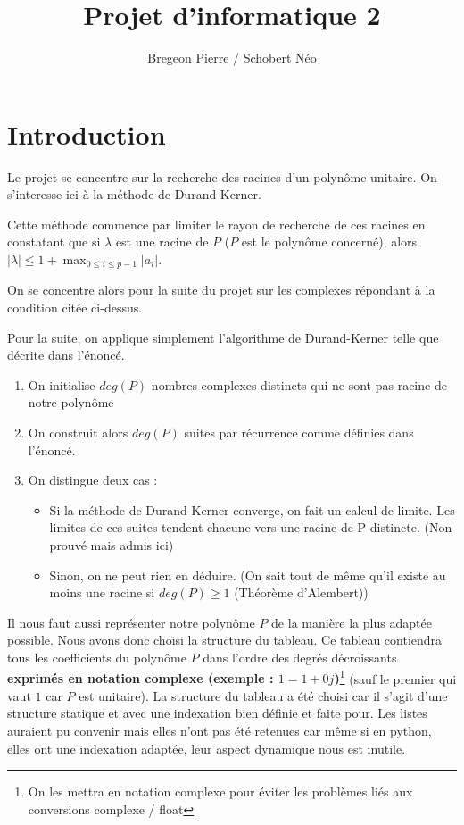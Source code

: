 \documentclass[a4paper, 11pt, hidelinks]{article}
\newcommand{\bs}{\bigskip}
\begin{document}
\title{Projet d'informatique 2}
\author{Bregeon Pierre / Schobert Néo}

\maketitle

\tableofcontents


\newpage 


\section{Introduction}
Le projet se concentre sur la recherche des racines d'un polynôme unitaire. On s'interesse ici à la méthode de Durand-Kerner.

\bs 
Cette méthode commence par limiter le rayon de recherche de ces racines en constatant que si $\lambda$ est une racine de $P$ ($P$ est le polynôme concerné),
alors $|\lambda|\leq 1+ \displaystyle\max_{0\leq i \leq p-1} |a_i|$.

\bs
On se concentre alors pour la suite du projet sur les complexes répondant à la condition citée ci-dessus.


Pour la suite, on applique simplement l'algorithme de Durand-Kerner telle que décrite dans l'énoncé.

\bs 
\begin{enumerate}
    \item On initialise $deg(P)$ nombres complexes distincts qui ne sont pas racine de notre polynôme
    \item On construit alors $deg(P)$ suites par récurrence comme définies dans l'énoncé.
    \item On distingue deux cas :
    \begin{itemize}
        \item Si la méthode de Durand-Kerner converge, on fait un calcul de limite. Les limites de ces suites tendent chacune vers une racine de P distincte. (Non prouvé mais admis ici)
        \item Sinon, on ne peut rien en déduire. (On sait tout de même qu'il existe au moins une racine si $deg(P)\geq 1$ (Théorème d'Alembert))
    \end{itemize}
\end{enumerate}
\bs

Il nous faut aussi représenter notre polynôme $P$ de la manière la plus adaptée possible. Nous avons donc choisi la structure
du tableau. Ce tableau contiendra tous les coefficients du polynôme $P$ dans l'ordre des degrés décroissants 
\textbf{exprimés en notation complexe (exemple : $1 = 1 + 0j$)}\footnote{On les mettra en notation complexe pour éviter les problèmes 
liés aux conversions complexe / float} (sauf le premier qui vaut $1$ car $P$ est unitaire).
La structure du tableau a été choisi car il s'agit d'une structure statique et avec une indexation bien définie et faite pour.
Les listes auraient pu convenir mais elles n'ont pas été retenues car même si en python, elles ont une  indexation adaptée,
leur aspect dynamique nous est inutile. 
\end{document}
